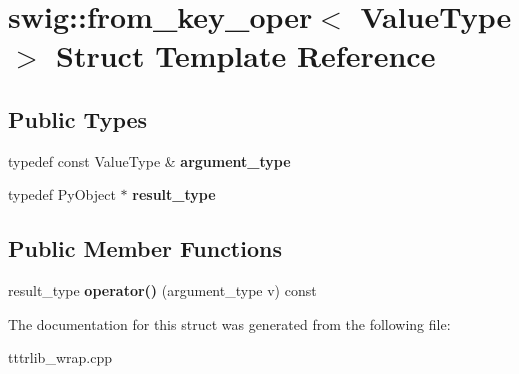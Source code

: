 \hypertarget{structswig_1_1from__key__oper}{}\section{swig\+:\+:from\+\_\+key\+\_\+oper$<$ Value\+Type $>$ Struct Template Reference}
\label{structswig_1_1from__key__oper}
\subsection*{Public Types}
\begin{DoxyCompactItemize}
\item 
\mbox{\label{structswig_1_1from__key__oper_a215e6c79db4b71c9aa22b77c4e420669}} 
typedef const Value\+Type \& {\bfseries argument\+\_\+type}
\item 
\mbox{\label{structswig_1_1from__key__oper_ae5b8af422665141a9736faf34791725b}} 
typedef Py\+Object $\ast$ {\bfseries result\+\_\+type}
\end{DoxyCompactItemize}
\subsection*{Public Member Functions}
\begin{DoxyCompactItemize}
\item 
\mbox{\label{structswig_1_1from__key__oper_a9af820e2d76f2830f57ae922c1ce908b}} 
result\+\_\+type {\bfseries operator()} (argument\+\_\+type v) const
\end{DoxyCompactItemize}


The documentation for this struct was generated from the following file\+:\begin{DoxyCompactItemize}
\item 
tttrlib\+\_\+wrap.\+cpp\end{DoxyCompactItemize}
